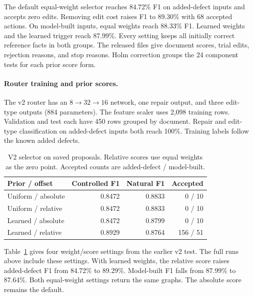 The default equal-weight selector reaches 84.72\% F1 on added-defect inputs
and accepts zero edits. Removing edit cost raises F1 to 89.30\% with
68 accepted actions. On model-built inputs, equal weights reach 88.33\% F1.
Learned weights and the learned trigger reach 87.99\%.
Every setting keeps all initially correct reference facts in both groups.
The released files give document scores, trial edits, rejection reasons,
and stop reasons. Holm correction groups the 24 component tests for each
prior score form.

\paragraph{Router training and prior scores.}

The v2 router has an $8\!\rightarrow\!32\!\rightarrow\!16$ network,
one repair output, and three edit-type outputs (884 parameters).
The feature scaler uses 2,098 training rows. Validation and test each have
450 rows grouped by document. Repair and edit-type classification on
added-defect inputs both reach 100\%.
Training labels follow the known added defects.

\begin{table}[t]
\centering
\caption{V2 selector on saved proposals. Relative scores use equal weights as the zero point. Accepted counts are added-defect / model-built.}
\label{tab:math_revision_selector}
\small
\begin{tabular}{lrrr}
\toprule
Prior / offset & Controlled F1 & Natural F1 & Accepted \\
\midrule
Uniform / absolute & 0.8472 & 0.8833 & 0 / 10 \\
Uniform / relative & 0.8472 & 0.8833 & 0 / 10 \\
Learned / absolute & 0.8472 & 0.8799 & 0 / 10 \\
Learned / relative & 0.8929 & 0.8764 & 156 / 51 \\
\bottomrule
\end{tabular}
\end{table}

Table~\ref{tab:math_revision_selector} gives four weight/score settings
from the earlier v2 test. The full runs above include these settings.
With learned weights, the relative score raises added-defect F1 from
84.72\% to 89.29\%. Model-built F1 falls from 87.99\% to 87.64\%.
Both equal-weight settings return the same graphs.
The absolute score remains the default.

